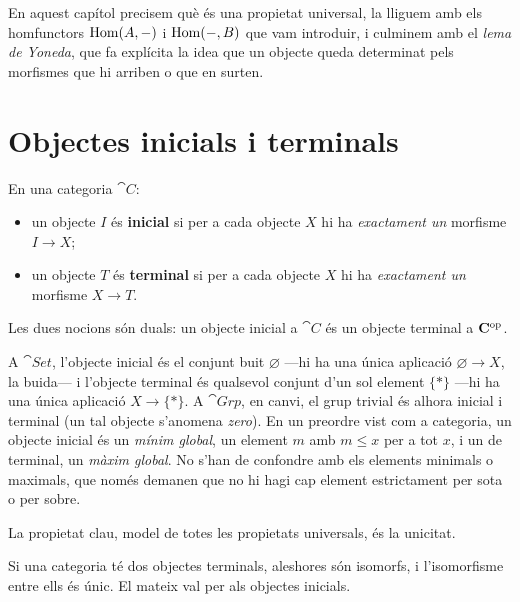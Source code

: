 En aquest capítol precisem què és una propietat universal, la lliguem amb els
homfunctors $\operatorname{Hom}(A,-)$ i $\operatorname{Hom}(-,B)$ que vam introduir, i culminem amb el
\emph{lema de Yoneda}, que fa explícita la idea que un objecte queda determinat pels
morfismes que hi arriben o que en surten.

\section{Objectes inicials i terminals}

\begin{definicio}
En una categoria $\cat{C}$:
\begin{itemize}
\item un objecte $I$ és \textbf{inicial} si per a cada objecte $X$ hi ha \emph{exactament un} morfisme $I\to X$;
\item un objecte $T$ és \textbf{terminal} si per a cada objecte $X$ hi ha \emph{exactament un} morfisme $X\to T$.
\end{itemize}
Les dues nocions són duals: un objecte inicial a $\cat{C}$ és un objecte terminal a $\mathbf{C}^{\mathrm{op}}$.
\end{definicio}

\begin{exemple}
A $\cat{Set}$, l'objecte inicial és el conjunt buit $\varnothing$ ---hi ha una única aplicació $\varnothing\to X$, la buida--- i l'objecte terminal és qualsevol conjunt d'un sol element $\{\ast\}$ ---hi ha una única aplicació $X\to\{\ast\}$. A $\cat{Grp}$, en canvi, el grup trivial és alhora inicial i terminal (un tal objecte s'anomena \emph{zero}). En un preordre vist com a categoria, un objecte inicial és un \emph{mínim global}, un element $m$ amb $m\le x$ per a tot $x$, i un de terminal, un \emph{màxim global}. No s'han de confondre amb els elements minimals o maximals, que només demanen que no hi hagi cap element estrictament per sota o per sobre.
\end{exemple}

La propietat clau, model de totes les propietats universals, és la unicitat.

\begin{proposicio}\label{prop:unicitat-terminal}
Si una categoria té dos objectes terminals, aleshores són isomorfs, i l'isomorfisme entre ells és únic. El mateix val per als objectes inicials.
\end{proposicio}

